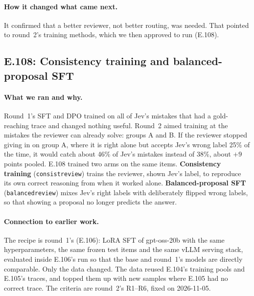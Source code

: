 \documentclass[11pt]{article}
\renewcommand{\_}{\origunderscore\allowbreak}
\begin{document}
\paragraph{How it changed what came next.}
It confirmed that a better reviewer, not better routing, was needed. That pointed to round~2's training methods, which we then approved to run (E.108).

\subsection{E.108: Consistency training and balanced-proposal SFT}\label{sec:e108}

\paragraph{What we ran and why.}
Round~1's SFT and DPO trained on all of Jev's mistakes that had a gold-reaching trace and changed nothing useful. Round~2 aimed training at the mistakes the reviewer can already solve: groups A and B. If the reviewer stopped giving in on group A, where it is right alone but accepts Jev's wrong label 25\% of the time, it would catch about 46\% of Jev's mistakes instead of 38\%, about $+9$ points pooled. E.108 trained two arms on the same items. \textbf{Consistency training} (\texttt{consist\_review}) trains the reviewer, shown Jev's label, to reproduce its own correct reasoning from when it worked alone. \textbf{Balanced-proposal SFT} (\texttt{balanced\_review}) mixes Jev's right labels with deliberately flipped wrong labels, so that showing a proposal no longer predicts the answer.

\paragraph{Connection to earlier work.}
The recipe is round~1's (E.106): LoRA SFT of gpt-oss-20b with the same hyperparameters, the same frozen test items and the same vLLM serving stack, evaluated inside E.106's run so that the base and round~1's models are directly comparable. Only the data changed. The data reused E.104's training pools and E.105's traces, and topped them up with new samples where E.105 had no correct trace. The criteria are round~2's R1--R6, fixed on 2026-11-05.
\end{document}
